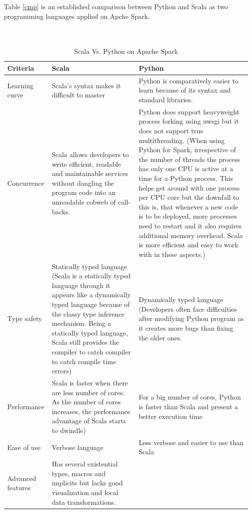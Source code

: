 Table \ref{cmp} is an established comparison between Python and Scala as two programming languages applied on Apche Spark. 
~\\ ~\\ ~\\
\begin{table}[H]
\caption{Scala Vs. Python on Apache Spark}
\begin{center}
\begin{tabularx}{17cm}{ |p{2.8cm}|X|X| } 
 \hline
 \textbf{Criteria} & \textbf{Scala} & \textbf{Python} \\ \hline
  Learning curve & Scala’s syntax makes it difficult to master & Python is comparatively easier to learn because of its syntax and standard libraries.\\ \hline
  Concurrence & Scala allows developers to write efficient, readable and maintainable services without dangling the program code into an unreadable cobweb of call-backs. & Python does support heavyweight process forking using uwsgi but it does not support true multithreading.\newline
(When using Python for Spark, irrespective of the number of threads the process has only one CPU is active at a time for a Python process. This helps get around with one process per CPU core but the downfall to this is, that whenever a new code is to be deployed, more processes need to restart and it also requires additional memory overhead. Scala is more efficient and easy to work with in these aspects.)\\ \hline
  Type safety & Statically typed language (Scala is a statically typed language through it appears like a dynamically typed language because of the classy type inference mechanism. Being a statically typed language, Scala still provides the compiler to catch compiler to catch compile time errors) & Dynamically typed language (Developers often face difficulties after modifying Python program as it creates more bugs than fixing the older ones.\\ \hline
  Performance & Scala is faster when there are less number of cores. As the number of cores increases, the performance advantage of Scala starts to dwindle) & For a big number of cores, Python is faster than Scala and present a better execution time \\ \hline
  Ease of use & Verbose language & Less verbose and easier to use than Scala\\ \hline
  Advanced \newline features & Has several existential types, macros and implicits but lacks good visualization and local data transformations.

\end{tabularx}
\end{center}
\end{table}
